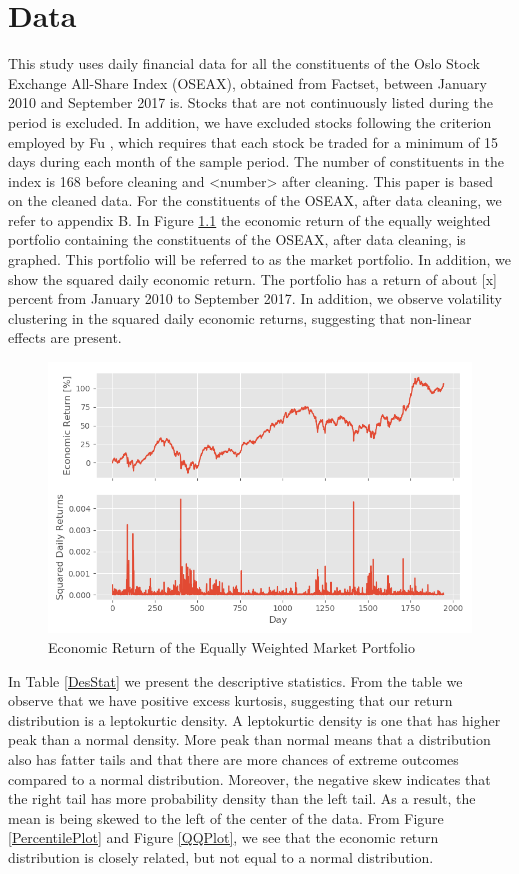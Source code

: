 \chapter{Data}
\label{Da}

This study uses daily financial data for all the constituents of the Oslo Stock Exchange All-Share Index (OSEAX), obtained from Factset, between January 2010 and September 2017 is. Stocks that are not continuously listed during the period is excluded. In addition, we have excluded stocks following the criterion employed by Fu \cite{Fu}, which requires that each stock be traded for a minimum of 15 days during each month of the sample period. The number of constituents in the index is 168 before cleaning and <number> after cleaning. This paper is based on the cleaned data. For the constituents of the OSEAX, after data cleaning, we refer to appendix B. In Figure \ref{MarketReturn} the economic return of the equally weighted portfolio containing the constituents of the OSEAX, after data cleaning, is graphed. This portfolio will be referred to as the market portfolio. In addition, we show the squared daily economic return. The portfolio has a return of about [x] percent from January 2010 to September 2017. In addition, we observe volatility clustering in the squared daily economic returns, suggesting that non-linear effects are present.

\begin{figure}[h]
\label{MarketReturn}
    \centering
    \includegraphics[scale = 0.65]{Plot/MarketReturn.png}
    \caption{Economic Return of the Equally Weighted Market Portfolio}
    \label{MarketReturn}
\end{figure}

In Table \ref{DesStat} we present the descriptive statistics. From the table we observe that we have positive excess kurtosis, suggesting that our return distribution is a leptokurtic density. A leptokurtic density is one that has higher peak than a normal density. More peak than normal means that a distribution also has fatter tails and that there are more chances of extreme outcomes compared to a normal distribution. Moreover, the negative skew indicates that the right tail has more probability density than the left tail. As a result, the mean is being skewed to the left of the center of the data. From Figure \ref{PercentilePlot} and Figure \ref{QQPlot}, we see that the economic return distribution is closely related, but not equal to a normal distribution.  

